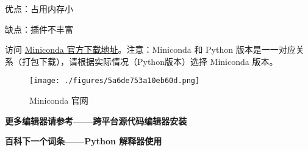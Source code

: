 优点：占用内存小

缺点：插件不丰富

访问 \href{https://docs.conda.io/en/latest/miniconda.html#}{Miniconda 官方下载地址}。注意：Miniconda 和 Python 版本是一一对应关系（打包下载），请根据实际情况（Python版本）选择 Miniconda 版本。

\begin{figure}[ht]
\centering
\texttt{[image: ./figures/5a6de753a10eb60d.png]}
\caption{Miniconda 官网} \label{fig_PyIDE_3}
\end{figure}

\textbf{更多编辑器请参考——跨平台源代码编辑器安装}


\textbf{百科下一个词条——Python 解释器使用}
